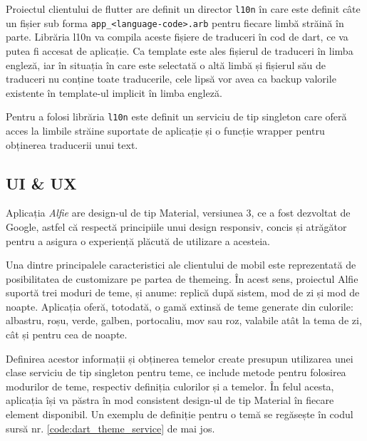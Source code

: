 Proiectul clientului de flutter are definit un director \texttt{l10n} în care este definit câte un fișier sub forma \texttt{app_<language-code>.arb} pentru fiecare limbă străină în parte. Librăria l10n va compila aceste fișiere de traduceri în cod de dart, ce va putea fi accesat de aplicație. Ca template este ales fișierul de traduceri în limba engleză, iar în situația în care este selectată o altă limbă și fișierul său de traduceri nu conține toate traducerile, cele lipsă vor avea ca backup valorile existente în template-ul implicit în limba engleză.

Pentru a folosi librăria \texttt{l10n} este definit un serviciu de tip singleton care oferă acces la limbile străine suportate de aplicație și o funcție wrapper pentru obținerea traducerii unui text.

\subsection{UI \& UX}

Aplicația \textit{Alfie} are design-ul de tip Material, versiunea 3, ce a fost dezvoltat de Google, astfel că respectă principiile unui design responsiv, concis și atrăgător pentru a asigura o experiență plăcută de utilizare a acesteia.

Una dintre principalele caracteristici ale clientului de mobil este reprezentată de posibilitatea de customizare pe partea de themeing. În acest sens, proiectul Alfie suportă trei moduri de teme, și anume: replică după sistem, mod de zi și mod de noapte. Aplicația oferă, totodată, o gamă extinsă de teme generate din culorile: albastru, roșu, verde, galben, portocaliu, mov sau roz, valabile atât la tema de zi, cât și pentru cea de noapte.

Definirea acestor informații și obținerea temelor create presupun utilizarea unei clase serviciu de tip singleton pentru teme, ce include metode pentru folosirea modurilor de teme, respectiv definiția culorilor și a temelor. În felul acesta, aplicația își va păstra în mod consistent design-ul de tip Material în fiecare element disponibil. Un exemplu de definiție pentru o temă se regăsește în codul sursă nr. \ref{code:dart_theme_service} de mai jos.

\begin{code}
    \inputminted[frame=single,framesep=2mm,linenos,breaklines,tabsize=2]{dart}{code/dart-theme-service.dart}
    \label{code:dart_theme_service}
\end{code}

